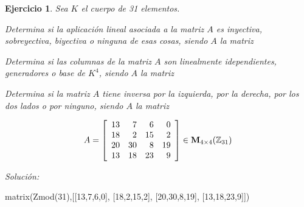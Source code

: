 \documentclass[12pt]{amsart}
\newtheorem{ejer}{Ejercicio}
\begin{document}
\begin{ejer} Sea $K$ el cuerpo de 31 elementos.
\newline
\noindent\begin{minipage}{\textwidth}
\begin{tcolorbox}[colback = green!20!white,title=Versión Aplicaciones]
Determina si la aplicaci\'on lineal asociada a la matriz $A$ es inyectiva, sobreyectiva, biyectiva o ninguna de esas cosas, siendo $A$ la matriz \end{tcolorbox}
\end{minipage} \newline
\noindent\begin{minipage}{\textwidth}
\begin{tcolorbox}[colback = blue!20!white,title=Versión Vectores]
Determina si las columnas de la matriz $A$ son linealmente idependientes, generadores o base de $K^{4}$, siendo $A$ la matriz \end{tcolorbox}
\end{minipage} \newline
\noindent\begin{minipage}{\textwidth} 
\begin{tcolorbox}[colback = red!20!white,title=Versión Inversas]
Determina si la matriz $A$ tiene inversa por la izquierda, por la derecha, por los dos lados o por ninguno, siendo $A$ la matriz 
\end{tcolorbox}
\end{minipage}
\[ A = \left[\begin{array}{rrrr}
13 & 7 & 6 & 0 \\
18 & 2 & 15 & 2 \\
20 & 30 & 8 & 19 \\
13 & 18 & 23 & 9
\end{array}\right] \in {\bf M}_{4\times 4}({\mathbb Z}_{31})\]
\end{ejer}

{\it Soluci\'on:}

\begin{sageblock}
matrix(Zmod(31),[[13,7,6,0],
[18,2,15,2],
[20,30,8,19],
[13,18,23,9]])
\end{sageblock}

\end{document}
